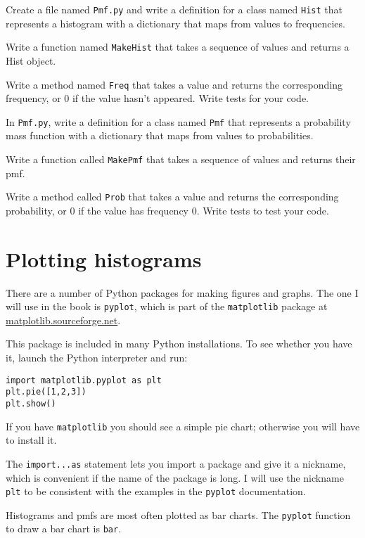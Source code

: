 \documentclass[10pt]{book}
\begin{document}
\begin{ex}
Create a file named {\tt Pmf.py} and write a definition for a class
named {\tt Hist} that represents a histogram with a dictionary
that maps from values to frequencies.

Write a function named {\tt MakeHist} that takes a sequence of
values and returns a Hist object.

Write a method named {\tt Freq} that takes a value and returns
the corresponding frequency, or 0
if the value hasn't appeared.  Write tests for your code.
\end{ex}


\begin{ex}
In {\tt Pmf.py}, write a definition for a class named {\tt Pmf} that
represents a probability mass function with a dictionary that maps
from values to probabilities.

Write a function called {\tt MakePmf} that takes a sequence of
values and returns their pmf.

Write a method called {\tt Prob} that
takes a value and returns the corresponding probability, or 0
if the value has frequency 0.  Write tests to test your code.
\end{ex}


\section{Plotting histograms}

There are a number of Python packages for making figures and graphs.
The one I will use in the book is {\tt pyplot}, which is part of
the {\tt matplotlib} package at \url{matplotlib.sourceforge.net}.

This package is included in many Python installations.  To see whether
you have it, launch the Python interpreter and run:

\begin{verbatim}
import matplotlib.pyplot as plt
plt.pie([1,2,3])
plt.show()
\end{verbatim}

If you have {\tt matplotlib} you should see a simple pie chart;
otherwise you will have to install it.

The {\tt import...as} statement lets you import a package and give
it a nickname, which is convenient if the name of the package is long.
I will use the nickname {\tt plt} to be consistent with the examples
in the {\tt pyplot} documentation.

Histograms and pmfs are most often plotted as bar charts.  The
{\tt pyplot} function to draw a bar chart is {\tt bar}.
\end{document}
